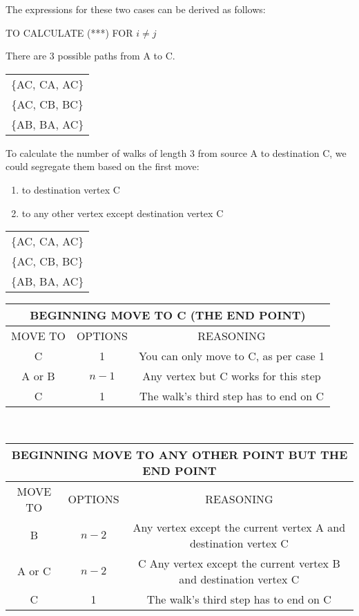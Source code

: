 \documentclass[12pt]{article}
\begin{document}
The expressions for these two cases can be derived as follows: 
\begin{center}
\Large TO CALCULATE (***) FOR $i \neq j$
\end{center}
\normalsize

There are 3 possible paths from A to C. \\
\begin{center}
\begin{tabular}{|c|}  \hline
\{AC, CA, AC\} \\
\{AC, CB, BC\} \\
\{AB, BA, AC\} \\ \hline
\end{tabular}
\end{center}

To calculate the number of walks of length 3 from source A to destination C, we could segregate them based on the first move:
\begin{enumerate}
\item to destination vertex C
\item to any other vertex except destination vertex C
\end{enumerate}
\begin{center}
\begin{tabular}{|c|}  \hline
\{AC, CA, AC\} \\
\{AC, CB, BC\} \\ \hline
\{AB, BA, AC\} \\ \hline
\end{tabular}


\begin{tabular}{|c|c|c|}
\multicolumn{3}{c}{BEGINNING MOVE TO C (THE END POINT)}  \\ \hline
MOVE TO & OPTIONS & REASONING \\ \hline
C & 1 & You can only move to C, as per case 1 \\ \hline
A or B &$n-1$ & Any vertex but C works for this step \\ \hline
C & 1 & The walk's third step has to end on C \\ \hline
\end{tabular} \\


\begin{tabular}{|c|c|c|}
\multicolumn{3}{c}{BEGINNING MOVE TO ANY OTHER POINT BUT THE END POINT}  \\ \hline
MOVE TO & OPTIONS & REASONING \\ \hline
B & $n-2$ & Any vertex except the current vertex A and destination vertex C \\ \hline
A or C & $n-2$ & C Any vertex except the current vertex B and destination vertex C \\ \hline
C & 1 & The walk's third step has to end on C \\ \hline
\end{tabular} \\
\end{center}
\end{document}
